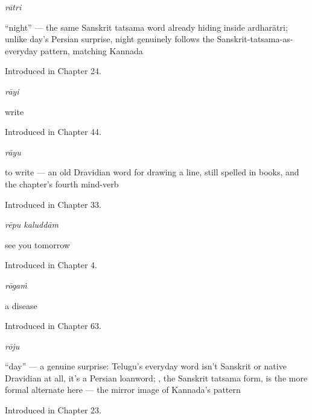 \noindent\begin{minipage}[t]{\linewidth}
\raggedright
\textbf{}\enspace\emph{rātri}\par
\small \textquotedblleft{}night\textquotedblright{} — the same Sanskrit tatsama word already hiding inside ardharātri; unlike day's Persian surprise, night genuinely follows the Sanskrit-tatsama-as-everyday pattern, matching Kannada\par
\footnotesize Introduced in Chapter 24.
\end{minipage}\par\medskip

\noindent\begin{minipage}[t]{\linewidth}
\raggedright
\textbf{}\enspace\emph{rāyi}\par
\small write\par
\footnotesize Introduced in Chapter 44.
\end{minipage}\par\medskip

\noindent\begin{minipage}[t]{\linewidth}
\raggedright
\textbf{}\enspace\emph{rāyu}\par
\small to write — an old Dravidian word for drawing a line, still spelled  in books, and the chapter's fourth mind-verb\par
\footnotesize Introduced in Chapter 33.
\end{minipage}\par\medskip

\noindent\begin{minipage}[t]{\linewidth}
\raggedright
\textbf{ }\enspace\emph{rēpu kaluddām}\par
\small see you tomorrow\par
\footnotesize Introduced in Chapter 4.
\end{minipage}\par\medskip

\noindent\begin{minipage}[t]{\linewidth}
\raggedright
\textbf{}\enspace\emph{rōgaṁ}\par
\small a disease\par
\footnotesize Introduced in Chapter 63.
\end{minipage}\par\medskip

\noindent\begin{minipage}[t]{\linewidth}
\raggedright
\textbf{}\enspace\emph{rōju}\par
\small \textquotedblleft{}day\textquotedblright{} — a genuine surprise: Telugu's everyday word isn't Sanskrit or native Dravidian at all, it's a Persian loanword; , the Sanskrit tatsama form, is the more formal alternate here — the mirror image of Kannada's pattern\par
\footnotesize Introduced in Chapter 23.
\end{minipage}\par\medskip

